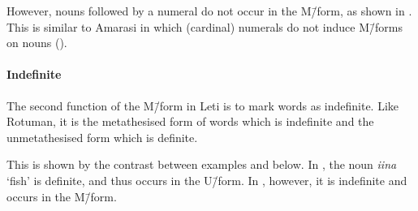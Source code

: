 \begin{exe}
\let\eachwordone=\itshape
\end{exe}

However, nouns followed by a numeral do not occur
in the M\=/form, as shown in .
This is similar to Amarasi in which (cardinal)
numerals do not induce M\=/forms on nouns ().

	\begin{exe}\let\eachwordone=\itshape
			\label{LetAM4}
	\end{exe}

\paragraph{Indefinite}\label{sec:LetInd}
The second function of the M\=/form in Leti
is to mark words as indefinite.
Like Rotuman, it is the metathesised form of words which is indefinite
and the unmetathesised form which is definite.

This is shown by the contrast between examples  and  below.
In , the noun \emph{iina} `fish' is definite,
and thus occurs in the U\=/form.
In , however, it is indefinite and occurs in the M\=/form.

